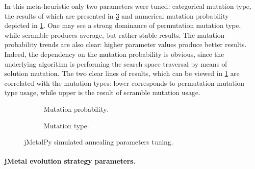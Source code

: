 In this meta-heuristic only two parameters were tuned: categorical mutation type, the results of which are presented in \cref{eval:pict:jmetalpy sa categoric} and numerical mutation probability depicted in \cref{eval:pict:jmetalpy sa numeric}. One may see a strong dominance of permutation mutation type, while scramble produces average, but rather stable results. The mutation probability trends are also clear: higher parameter values produce better results. Indeed, the dependency on the mutation probability is obvious, since the underlying algorithm is performing the search space traversal by means of solution mutation. The two clear lines of results, which can be viewed in \cref{eval:pict:jmetalpy sa numeric} are correlated with the mutation types: lower corresponds to permutation mutation type usage, while upper is the result of scramble mutation usage.
\begin{figure}[h]
	\centering
	\begin{subfigure}{0.35\textwidth}
		\vspace{-10pt}
		
		\caption{Mutation probability.}
		\label{eval:pict:jmetalpy sa numeric}
	\end{subfigure}
	\hfil 
	\begin{subfigure}{0.4\textwidth}
		
		\vspace{-5pt}
		\caption{Mutation type.}
		\label{eval:pict:jmetalpy sa categoric}
	\end{subfigure}
	\caption{jMetalPy simulated annealing parameters tuning.}
\end{figure}


\paragraph{jMetal evolution strategy parameters.}

